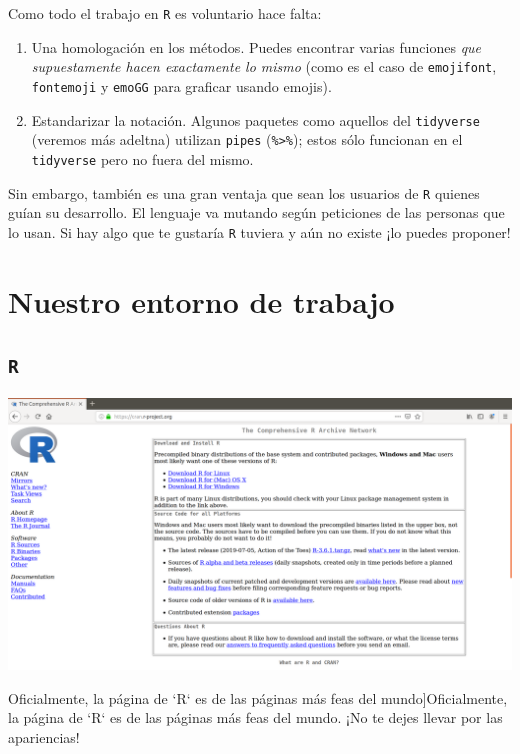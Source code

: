 \documentclass[]{tufte-book}
\begin{document}
Como todo el trabajo en \texttt{R} es voluntario hace falta:

\begin{enumerate}
\def\labelenumi{\arabic{enumi}.}
\item
  Una homologación en los métodos. Puedes encontrar varias funciones
  \emph{que supuestamente hacen exactamente lo mismo} (como es el caso
  de \texttt{emojifont}, \texttt{fontemoji} y \texttt{emoGG} para
  graficar usando emojis).
\item
  Estandarizar la notación. Algunos paquetes como aquellos del
  \texttt{tidyverse} (veremos más adeltna) utilizan \texttt{pipes}
  (\texttt{\%\textgreater{}\%}); estos sólo funcionan en el
  \texttt{tidyverse} pero no fuera del mismo.
\end{enumerate}

Sin embargo, también es una gran ventaja que sean los usuarios de
\texttt{R} quienes guían su desarrollo. El lenguaje va mutando según
peticiones de las personas que lo usan. Si hay algo que te gustaría
\texttt{R} tuviera y aún no existe ¡lo puedes proponer!

\hypertarget{nuestro-entorno-de-trabajo}{%
\section{Nuestro entorno de trabajo}\label{nuestro-entorno-de-trabajo}}

\hypertarget{r-1}{%
\subsection{\texorpdfstring{\texttt{R}}{R}}\label{r-1}}

\begin{marginfigure}
\includegraphics[width=40in]{images/CRAN1} \caption[Oficialmente, la página de `R` es de las páginas más feas del mundo]{Oficialmente, la página de `R` es de las páginas más feas del mundo. ¡No te dejes llevar por las apariencias!}\label{fig:unnamed-chunk-5}
\end{marginfigure}
\end{document}
